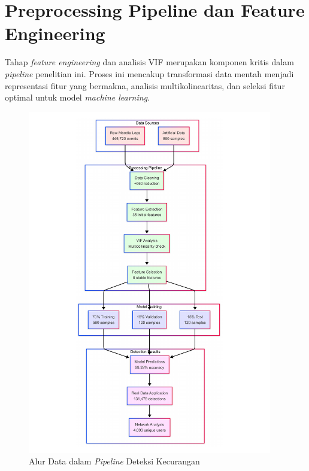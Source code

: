 \section{Preprocessing Pipeline dan Feature Engineering}
\label{sec:preprocessingPipelineFeatureEngineering}
Tahap \textit{feature engineering} dan analisis VIF merupakan komponen kritis dalam \textit{pipeline} penelitian ini. Proses ini mencakup transformasi data mentah menjadi representasi fitur yang bermakna, analisis multikolinearitas, dan seleksi fitur optimal untuk model \textit{machine learning}. 

\begin{figure}[htbp]
    \centering
    \includegraphics[width=0.95\textwidth]{figures/data_flow_diagram.pdf}
    \caption{Alur Data dalam \textit{Pipeline} Deteksi Kecurangan}
    \label{fig:data_flow}
\end{figure}

